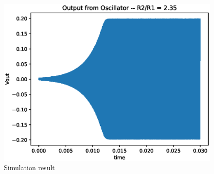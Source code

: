 \begin{enumerate}[label=\arabic*.,ref=\theenumi]
\begin{figure}[!ht]
\centering
\includegraphics[width=\columnwidth]{./figs/ee18btech11049/ee18btech11049_4.eps}
\caption{Simulation result}
\label{fig:ee18btech11049_4}
\end{figure}

\end{enumerate}
